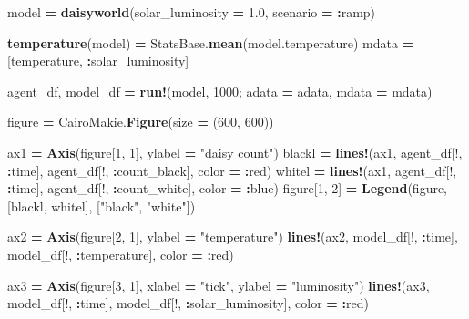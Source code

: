 \documentclass[
  english,
  russian,
  12pt,
  a4paper,
  DIV=11,
  numbers=noendperiod]{scrreprt}
\newenvironment{Shaded}{\begin{snugshade}}{\end{snugshade}}
\newcommand{\FloatTok}[1]{\textcolor[rgb]{0.00,0.00,0.81}{#1}}
\newcommand{\FunctionTok}[1]{\textcolor[rgb]{0.13,0.29,0.53}{\textbf{#1}}}
\newcommand{\NormalTok}[1]{#1}
\newcommand{\OperatorTok}[1]{\textcolor[rgb]{0.81,0.36,0.00}{\textbf{#1}}}
\newcommand{\StringTok}[1]{\textcolor[rgb]{0.31,0.60,0.02}{#1}}
\begin{document}
\begin{Shaded}
\begin{Highlighting}[]
\NormalTok{model }\OperatorTok{=} \FunctionTok{daisyworld}\NormalTok{(solar\_luminosity }\OperatorTok{=} \FloatTok{1.0}\NormalTok{, scenario }\OperatorTok{=} \OperatorTok{:}\NormalTok{ramp)}

\FunctionTok{temperature}\NormalTok{(model) }\OperatorTok{=}\NormalTok{ StatsBase.}\FunctionTok{mean}\NormalTok{(model.temperature)}
\NormalTok{mdata }\OperatorTok{=}\NormalTok{ [temperature, }\OperatorTok{:}\NormalTok{solar\_luminosity]}

\NormalTok{agent\_df, model\_df }\OperatorTok{=} \FunctionTok{run!}\NormalTok{(model, }\FloatTok{1000}\NormalTok{; adata }\OperatorTok{=}\NormalTok{ adata, mdata }\OperatorTok{=}\NormalTok{ mdata)}

\NormalTok{figure }\OperatorTok{=}\NormalTok{ CairoMakie.}\FunctionTok{Figure}\NormalTok{(size }\OperatorTok{=}\NormalTok{ (}\FloatTok{600}\NormalTok{, }\FloatTok{600}\NormalTok{))}

\NormalTok{ax1 }\OperatorTok{=} \FunctionTok{Axis}\NormalTok{(figure[}\FloatTok{1}\NormalTok{, }\FloatTok{1}\NormalTok{], ylabel }\OperatorTok{=} \StringTok{"daisy count"}\NormalTok{)}
\NormalTok{blackl }\OperatorTok{=} \FunctionTok{lines!}\NormalTok{(ax1, agent\_df[!, }\OperatorTok{:}\NormalTok{time], agent\_df[!, }\OperatorTok{:}\NormalTok{count\_black], color }\OperatorTok{=} \OperatorTok{:}\NormalTok{red)}
\NormalTok{whitel }\OperatorTok{=} \FunctionTok{lines!}\NormalTok{(ax1, agent\_df[!, }\OperatorTok{:}\NormalTok{time], agent\_df[!, }\OperatorTok{:}\NormalTok{count\_white], color }\OperatorTok{=} \OperatorTok{:}\NormalTok{blue)}
\NormalTok{figure[}\FloatTok{1}\NormalTok{, }\FloatTok{2}\NormalTok{] }\OperatorTok{=} \FunctionTok{Legend}\NormalTok{(figure, [blackl, whitel], [}\StringTok{"black"}\NormalTok{, }\StringTok{"white"}\NormalTok{])}

\NormalTok{ax2 }\OperatorTok{=} \FunctionTok{Axis}\NormalTok{(figure[}\FloatTok{2}\NormalTok{, }\FloatTok{1}\NormalTok{], ylabel }\OperatorTok{=} \StringTok{"temperature"}\NormalTok{)}
\FunctionTok{lines!}\NormalTok{(ax2, model\_df[!, }\OperatorTok{:}\NormalTok{time], model\_df[!, }\OperatorTok{:}\NormalTok{temperature], color }\OperatorTok{=} \OperatorTok{:}\NormalTok{red)}

\NormalTok{ax3 }\OperatorTok{=} \FunctionTok{Axis}\NormalTok{(figure[}\FloatTok{3}\NormalTok{, }\FloatTok{1}\NormalTok{], xlabel }\OperatorTok{=} \StringTok{"tick"}\NormalTok{, ylabel }\OperatorTok{=} \StringTok{"luminosity"}\NormalTok{)}
\FunctionTok{lines!}\NormalTok{(ax3, model\_df[!, }\OperatorTok{:}\NormalTok{time], model\_df[!, }\OperatorTok{:}\NormalTok{solar\_luminosity], color }\OperatorTok{=} \OperatorTok{:}\NormalTok{red)}


\end{Highlighting}
\end{Shaded}
\end{document}
